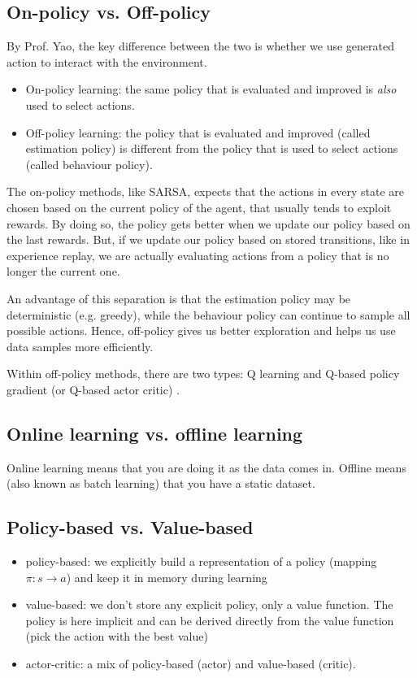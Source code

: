 \documentclass[lang=en,mode=normal,device=normal,color=blue,12pt]{elegantnote}
\DeclareMathOperator*{\1}{\mathbbm{1}}
\begin{document}
\subsection{On-policy vs. Off-policy}
\label{appendix:on-off-policy}

By Prof. Yao, the key difference between the two is whether we use generated action to interact with the environment.

\begin{itemize}
\item On-policy learning: the same policy that is evaluated and improved is \textit{also} used to select actions.
\item Off-policy learning: the policy that is evaluated and improved (called estimation policy) is different from the policy that is used to select actions (called behaviour policy).
\end{itemize}

The on-policy methods, like SARSA, expects that the actions in every state are chosen based on the current policy of the agent, that usually tends to exploit rewards. By doing so, the policy gets better when we update our policy based on the last rewards. But, if we update our policy based on stored transitions, like in experience replay, we are actually evaluating actions from a policy that is no longer the current one.

An advantage of this separation is that the estimation policy may be deterministic (e.g. greedy), while the behaviour policy can continue to sample all possible actions.
Hence, off-policy gives us better exploration and helps us use data samples more efficiently.

Within off-policy methods, there are two types: Q learning and Q-based policy gradient (or Q-based actor critic) \cite{ytbcs287}.

\subsection{Online learning vs. offline learning}
Online learning means that you are doing it as the data comes in. Offline means (also known as batch learning) that you have a static dataset.

\subsection{Policy-based vs. Value-based}

\begin{itemize}
\item policy-based: we explicitly build a representation of a policy (mapping $\pi:s\rightarrow a$) and keep it in memory during learning
\item value-based: we don't store any explicit policy, only a value function. The policy is here implicit and can be derived directly from the value function (pick the action with the best value)
\item actor-critic: a mix of policy-based (actor) and value-based (critic).
\end{itemize}
\end{document}
